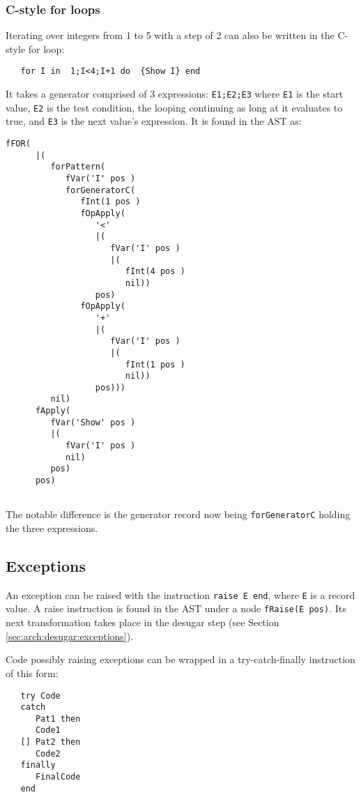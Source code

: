 \documentclass[a4paper]{memoir}
\begin{document}
\subsubsection{C-style for loops}
Iterating over integers from 1 to 5 with a step of 2 can also be written in the C-style for loop:
\begin{lstlisting}
   for I in  1;I<4;I+1 do  {Show I} end
\end{lstlisting}
It takes a generator comprised of 3 expressions: \lstinline!E1;E2;E3! where
\lstinline!E1! is the start value, \lstinline!E2! is the test condition, the
looping continuing as long at it evaluates to true, and \lstinline!E3! is the
next value's expression.
It is found in the AST as:
\begin{lstlisting}
fFOR(
      |(
         forPattern(
            fVar('I' pos )
            forGeneratorC(
               fInt(1 pos )
               fOpApply(
                  '<'
                  |(
                     fVar('I' pos )
                     |(
                        fInt(4 pos )
                        nil))
                  pos)
               fOpApply(
                  '+'
                  |(
                     fVar('I' pos )
                     |(
                        fInt(1 pos )
                        nil))
                  pos)))
         nil)
      fApply(
         fVar('Show' pos )
         |(
            fVar('I' pos )
            nil)
         pos)
      pos)
  
\end{lstlisting}

The notable difference is the generator record now being
\lstinline!forGeneratorC! holding the three expressions.

\subsection{Exceptions}\label{sec:input:exceptions}
An exception can be raised with the instruction \lstinline!raise E end!, where
\lstinline!E! is a record value. %
A raise instruction is found in the AST under a node \lstinline!fRaise(E pos)!.
Its next transformation takes place in the desugar step (see Section
\ref{sec:arch:desugar:exceptions}).

Code possibly raising exceptions can be wrapped in a try-catch-finally
instruction of this form:
\begin{lstlisting}
   try Code
   catch
      Pat1 then
      Code1
   [] Pat2 then
      Code2
   finally
      FinalCode
   end
\end{lstlisting}
\end{document}
